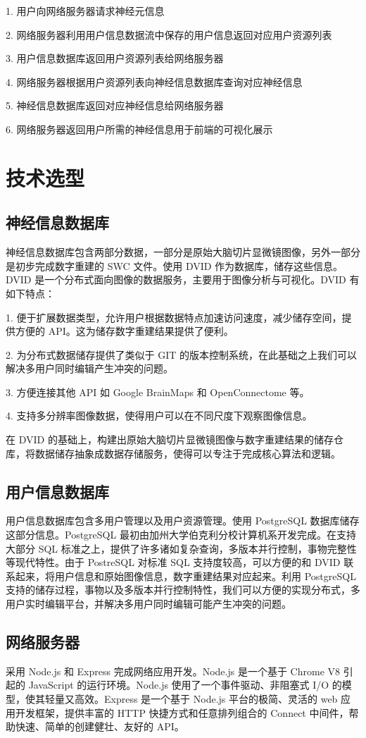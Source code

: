1. 用户向网络服务器请求神经元信息

2. 网络服务器利用用户信息数据流中保存的用户信息返回对应用户资源列表

3. 用户信息数据库返回用户资源列表给网络服务器

4. 网络服务器根据用户资源列表向神经信息数据库查询对应神经信息

5. 神经信息数据库返回对应神经信息给网络服务器

6. 网络服务器返回用户所需的神经信息用于前端的可视化展示

\section{技术选型}

\subsection{神经信息数据库}
神经信息数据库包含两部分数据，一部分是原始大脑切片显微镜图像，另外一部分是初步完成数字重建的 SWC 文件。使用 DVID 作为数据库，储存这些信息。DVID 是一个分布式面向图像的数据服务，主要用于图像分析与可视化。DVID 有如下特点：

1. 便于扩展数据类型，允许用户根据数据特点加速访问速度，减少储存空间，提供方便的 API。这为储存数字重建结果提供了便利。

2. 为分布式数据储存提供了类似于 GIT 的版本控制系统，在此基础之上我们可以解决多用户同时编辑产生冲突的问题。

3. 方便连接其他 API 如 Google BrainMaps 和 OpenConnectome 等。

4. 支持多分辨率图像数据，使得用户可以在不同尺度下观察图像信息。

在 DVID 的基础上，构建出原始大脑切片显微镜图像与数字重建结果的储存仓库，将数据储存抽象成数据存储服务，使得可以专注于完成核心算法和逻辑。


\subsection{用户信息数据库}
用户信息数据库包含多用户管理以及用户资源管理。使用 PostgreSQL 数据库储存这部分信息。PostgreSQL 最初由加州大学伯克利分校计算机系开发完成。在支持大部分 SQL 标准之上，提供了许多诸如复杂查询，多版本并行控制，事物完整性等现代特性。由于 PostreSQL 对标准 SQL 支持度较高，可以方便的和 DVID 联系起来，将用户信息和原始图像信息，数字重建结果对应起来。利用 PostgreSQL 支持的储存过程，事物以及多版本并行控制特性，我们可以方便的实现分布式，多用户实时编辑平台，并解决多用户同时编辑可能产生冲突的问题。

\subsection{网络服务器}
采用 Node.js 和 Express 完成网络应用开发。Node.js 是一个基于 Chrome V8 引起的 JavaScript 的运行环境。Node.js 使用了一个事件驱动、非阻塞式 I/O 的模型，使其轻量又高效。Express 是一个基于 Node.js 平台的极简、灵活的 web 应用开发框架，提供丰富的 HTTP 快捷方式和任意排列组合的 Connect 中间件，帮助快速、简单的创建健壮、友好的 API。